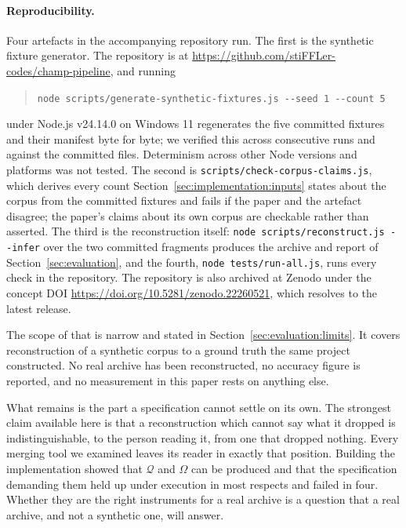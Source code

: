 \paragraph{Reproducibility.}
Four artefacts in the accompanying repository run. The first is the synthetic
fixture generator. The repository is at
\url{https://github.com/stiFFLer-codes/champ-pipeline}, and running
\begin{quote}
\texttt{node scripts/generate-synthetic-fixtures.js -{}-seed 1 -{}-count 5}
\end{quote}
under Node.js v24.14.0 on Windows 11 regenerates the five committed fixtures and
their manifest byte for byte; we verified this across consecutive runs and against
the committed files. Determinism across other Node versions and platforms was not
tested. The second is
\texttt{scripts/\allowbreak check-\allowbreak corpus-\allowbreak claims.js}, which
derives every count Section~\ref{sec:implementation:inputs} states about the
corpus from the committed fixtures and fails if the paper and the artefact
disagree; the paper's claims about its own corpus are checkable rather than
asserted. The third is the reconstruction itself:
\texttt{node scripts/reconstruct.js -{}-infer} over the two committed fragments
produces the archive and report of Section~\ref{sec:evaluation}, and the
fourth, \texttt{node tests/run-all.js}, runs every check in the repository. The
repository is also archived at Zenodo under the concept DOI
\url{https://doi.org/10.5281/zenodo.22260521}, which resolves to the latest
release.

The scope of that is narrow and stated in
Section~\ref{sec:evaluation:limits}. It covers reconstruction of a synthetic
corpus to a ground truth the same project constructed. No real archive has been
reconstructed, no accuracy figure is reported, and no measurement in this paper
rests on anything else.

What remains is the part a specification cannot settle on its own. The strongest
claim available here is that a reconstruction which cannot say what it dropped is
indistinguishable, to the person reading it, from one that dropped nothing. Every
merging tool we examined leaves its reader in exactly that position. Building the
implementation showed that $\mathcal{Q}$ and $\Omega$ can be produced and that
the specification demanding them held up under execution in most respects and
failed in four. Whether they are the right instruments for a real archive is a
question that a real archive, and not a synthetic one, will answer.
